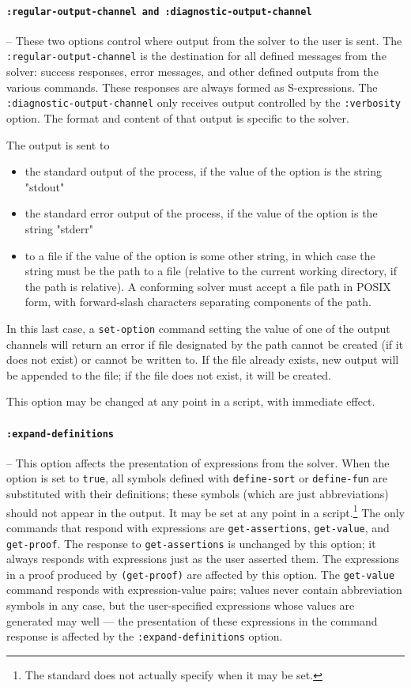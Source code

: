 \documentclass[12pt,oneside]{report}
\newcommand{\nospace}{\setlength{\itemsep}{0in}\setlength{\parsep}{0in}\setlength{\parskip}{0in}\setlength{\topsep}{0in}}
\begin{document}
\paragraph{\tt :regular-output-channel {\rm and} :diagnostic-output-channel} -- These two options control where output from the solver to the user is sent.  
The {\tt :regular-output-channel} is the destination for all defined messages from the solver:  success responses, error messages, and other defined outputs from the various commands. These
responses are always formed as S-expressions.
The {\tt :diagnostic-output-channel} only receives output controlled by the {\tt :verbosity} option.  The format and content of that output is specific to the solver.

The output is sent to 
\begin{itemize} \nospace
\item the standard output of the process, if the value of the option is the string "stdout"
\item the standard error output of the process, if the value of the option is the string "stderr"
\item to a file if the value of the option is some other string, in which case the string must be the path to a file (relative to the current working directory, if the path is relative). A conforming solver must accept a file path in POSIX form, with forward-slash characters separating components of the path.

\end{itemize}
In this last case, a {\tt set-option} command setting the value of one of the output channels will return an error if file designated by the path cannot be created (if it does not exist) or 
cannot be written to. If the file already exists, new output will be appended to the file; if the file does not exist, it will be created.

This option may be changed at any point in a script, with immediate effect.

\paragraph{\tt :expand-definitions} --
This option affects the presentation of expressions from the solver. When the option is set to {\tt true}, all symbols defined with {\tt define-sort} or {\tt define-fun} are
substituted with their definitions; these symbols (which are just abbreviations) should not appear in the output. It may be set at any point in a script.\footnote{The standard does not actually specify when it may be set.} The only commands that respond with expressions are {\tt get-assertions}, {\tt get-value}, and {\tt get-proof}. The response to {\tt get-assertions} is unchanged by this option; it always responds with expressions just as
the user asserted them. The expressions in a proof produced by {\tt (get-proof)} are affected by this option. The {\tt get-value} command
responds with expression-value pairs; values never contain abbreviation symbols in any case, but the user-specified expressions whose values are generated may well --- the presentation of these expressions in the command response is affected by the {\tt :expand-definitions} option.
\end{document}
